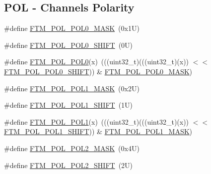 \subsection*{P\+OL -\/ Channels Polarity}
\begin{DoxyCompactItemize}
\item 
\#define \mbox{\hyperlink{group___f_t_m___register___masks_ga7ab70d13d9e83b5ae2beb7f5ba35dec3}{F\+T\+M\+\_\+\+P\+O\+L\+\_\+\+P\+O\+L0\+\_\+\+M\+A\+SK}}~(0x1\+U)
\item 
\#define \mbox{\hyperlink{group___f_t_m___register___masks_ga5cd0fca223b478bedc823f61829aadf9}{F\+T\+M\+\_\+\+P\+O\+L\+\_\+\+P\+O\+L0\+\_\+\+S\+H\+I\+FT}}~(0\+U)
\item 
\#define \mbox{\hyperlink{group___f_t_m___register___masks_ga9217b819a8226fa7c1a2ecd60fa5eff6}{F\+T\+M\+\_\+\+P\+O\+L\+\_\+\+P\+O\+L0}}(x)~(((uint32\+\_\+t)(((uint32\+\_\+t)(x)) $<$$<$ \mbox{\hyperlink{group___f_t_m___register___masks_ga5cd0fca223b478bedc823f61829aadf9}{F\+T\+M\+\_\+\+P\+O\+L\+\_\+\+P\+O\+L0\+\_\+\+S\+H\+I\+FT}})) \& \mbox{\hyperlink{group___f_t_m___register___masks_ga7ab70d13d9e83b5ae2beb7f5ba35dec3}{F\+T\+M\+\_\+\+P\+O\+L\+\_\+\+P\+O\+L0\+\_\+\+M\+A\+SK}})
\item 
\#define \mbox{\hyperlink{group___f_t_m___register___masks_ga7ba292d039aa88301d93652d34a1d120}{F\+T\+M\+\_\+\+P\+O\+L\+\_\+\+P\+O\+L1\+\_\+\+M\+A\+SK}}~(0x2\+U)
\item 
\#define \mbox{\hyperlink{group___f_t_m___register___masks_gab2e3af913f9d6e537df78c69259ee8f5}{F\+T\+M\+\_\+\+P\+O\+L\+\_\+\+P\+O\+L1\+\_\+\+S\+H\+I\+FT}}~(1\+U)
\item 
\#define \mbox{\hyperlink{group___f_t_m___register___masks_ga2d91be4d053750be93b985e163de6602}{F\+T\+M\+\_\+\+P\+O\+L\+\_\+\+P\+O\+L1}}(x)~(((uint32\+\_\+t)(((uint32\+\_\+t)(x)) $<$$<$ \mbox{\hyperlink{group___f_t_m___register___masks_gab2e3af913f9d6e537df78c69259ee8f5}{F\+T\+M\+\_\+\+P\+O\+L\+\_\+\+P\+O\+L1\+\_\+\+S\+H\+I\+FT}})) \& \mbox{\hyperlink{group___f_t_m___register___masks_ga7ba292d039aa88301d93652d34a1d120}{F\+T\+M\+\_\+\+P\+O\+L\+\_\+\+P\+O\+L1\+\_\+\+M\+A\+SK}})
\item 
\#define \mbox{\hyperlink{group___f_t_m___register___masks_gaa23bd3b9b514732a3c218eece18538ae}{F\+T\+M\+\_\+\+P\+O\+L\+\_\+\+P\+O\+L2\+\_\+\+M\+A\+SK}}~(0x4\+U)
\item 
\#define \mbox{\hyperlink{group___f_t_m___register___masks_gad025805c22c3fad213b65fc3163b8301}{F\+T\+M\+\_\+\+P\+O\+L\+\_\+\+P\+O\+L2\+\_\+\+S\+H\+I\+FT}}~(2\+U)
\item 

\end{DoxyCompactItemize}
